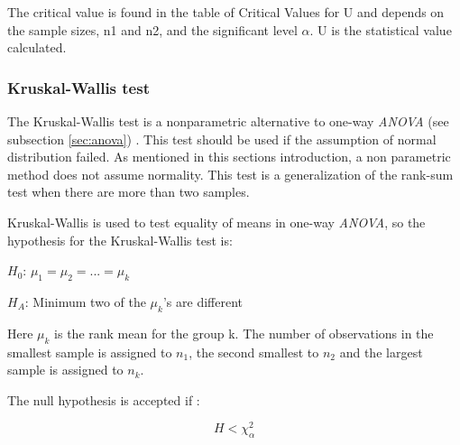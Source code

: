 The critical value is found in the table of Critical Values for U and depends on the sample sizes, n1 and n2, and the significant level $\alpha$. U is the statistical value calculated. 

\subsubsection[Kruskal]{Kruskal-Wallis test}\label{sec:kruskal-w-test}
The Kruskal-Wallis test is a nonparametric alternative to one-way \textit{ANOVA} (see subsection \ref{sec:anova})  \citep{Walpole2012}. This test should be used if the assumption of normal distribution failed. As mentioned in this sections introduction, a non parametric method does not assume normality. This test is a generalization of the rank-sum test when there are more than two samples.

Kruskal-Wallis is used to test equality of means in one-way \textit{ANOVA}, so the hypothesis for the Kruskal-Wallis test is:\newline

\centerline{$H_{0}$:  $\mu_{1} =  \mu_{2} = ... = \mu_{k} $} 
\centerline{$H_{A}$: Minimum two of the $\mu_{k}$'s are different}

Here $\mu_{k}$ is the rank mean for the group k. The number of observations in the smallest sample is assigned to $n_1$, the second smallest to $n_2$ and the largest sample is assigned to $n_k$. 

The null hypothesis is accepted if \citep[p.~668]{Walpole2012}: 

\begin{equation}
\label{eq:kruskapw-accept}
H < \chi^{2}_{\alpha}
\end{equation}

